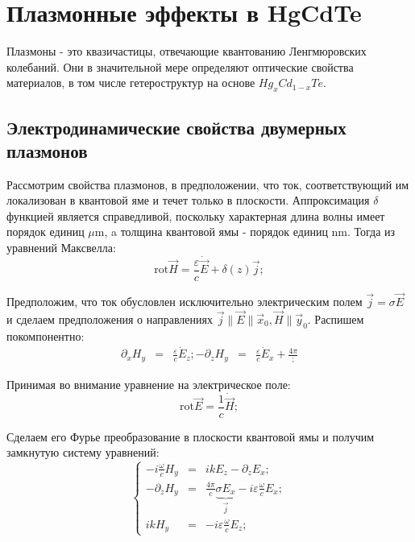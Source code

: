 \documentclass[../main.tex]{subfiles}
\newcommand{\rot}{\text{rot}}
\begin{document}
    \chapter{Плазмонные эффекты в HgCdTe}
    
    Плазмоны - это квазичастицы, отвечающие квантованию 
    Ленгмюровских колебаний. Они в значительной мере 
    определяют оптические свойства материалов, в том числе 
    гетероструктур на основе $Hg_xCd_{1-x}Te$.

    \section{Электродинамические свойства двумерных плазмонов}

    Рассмотрим свойства плазмонов, в предположении, что ток,
    соответствующий им локализован в квантовой яме и течет только
    в плоскости. Аппроксимация $\delta$ функцией является 
    справедливой, поскольку характерная длина волны имеет порядок 
    единиц $\mu\text{m}$, a толщина квантовой ямы - порядок единиц 
    $\text{nm}$. Тогда из уравнений Максвелла:
    \begin{equation}
        \rot \vec H = \frac{\varepsilon}{c} \dot{\vec E} + \delta(z) \vec j;
    \end{equation}

    Предположим, что ток обусловлен исключительно электрическим полем
    $\vec j  = \sigma \vec E$ и сделаем предположения о направлениях 
    $\vec j \parallel \vec E \parallel \vec{x}_0, \vec H \parallel \vec{y}_0$.
    Распишем покомпонентно:
    \begin{equation}
        \begin{aligned}
            \partial_x H_y &=& \frac{\varepsilon}{c} \dot{E}_z;
            -\partial_z H_y &=& \frac{\varepsilon}{c} \dot{E}_x + \frac{4\pi };
        \end{aligned}
    \end{equation}

    Принимая во внимание уравнение на электрическое поле:
    \begin{equation}
        \rot \vec E = \frac{1}{c} \dot \vec H;
    \end{equation}

    Сделаем его Фурье преобразование в плоскости квантовой ямы
    и получим замкнутую систему уравнений:
    \begin{equation}
        \left\{
        \begin{aligned}
            - i \frac{\omega}{c} H_y &=& i k E_z - \partial_z E_x;\\
            - \partial_z H_y  &=& \frac{4\pi}{c} \underbrace{\sigma E_x}_{\vec j} 
            - i \varepsilon  \frac{\omega}{c} E_x;\\
            ik H_y  &=& - i \varepsilon \frac{\omega}{c} E_z;
        \end{aligned}
        \right.
    \end{equation}
\end{document}
